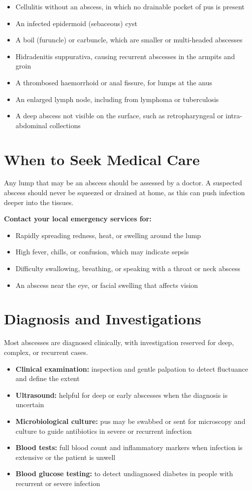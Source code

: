 \begin{itemize}
    \item Cellulitis without an abscess, in which no drainable pocket of pus is present
    \item An infected epidermoid (sebaceous) cyst
    \item A boil (furuncle) or carbuncle, which are smaller or multi-headed abscesses
    \item Hidradenitis suppurativa, causing recurrent abscesses in the armpits and groin
    \item A thrombosed haemorrhoid or anal fissure, for lumps at the anus
    \item An enlarged lymph node, including from lymphoma or tuberculosis
    \item A deep abscess not visible on the surface, such as retropharyngeal or intra-abdominal collections
\end{itemize}

\section*{When to Seek Medical Care}
Any lump that may be an abscess should be assessed by a doctor. A suspected abscess should never be squeezed or drained at home, as this can push infection deeper into the tissues.

\textbf{Contact your local emergency services for:}
\begin{itemize}
    \item Rapidly spreading redness, heat, or swelling around the lump
    \item High fever, chills, or confusion, which may indicate sepsis
    \item Difficulty swallowing, breathing, or speaking with a throat or neck abscess
    \item An abscess near the eye, or facial swelling that affects vision
\end{itemize}

\section*{Diagnosis and Investigations}
Most abscesses are diagnosed clinically, with investigation reserved for deep, complex, or recurrent cases.

\begin{itemize}
    \item \textbf{Clinical examination:} inspection and gentle palpation to detect fluctuance and define the extent
    \item \textbf{Ultrasound:} helpful for deep or early abscesses when the diagnosis is uncertain
    \item \textbf{Microbiological culture:} pus may be swabbed or sent for microscopy and culture to guide antibiotics in severe or recurrent infection
    \item \textbf{Blood tests:} full blood count and inflammatory markers when infection is extensive or the patient is unwell
    \item \textbf{Blood glucose testing:} to detect undiagnosed diabetes in people with recurrent or severe infection
\end{itemize}

